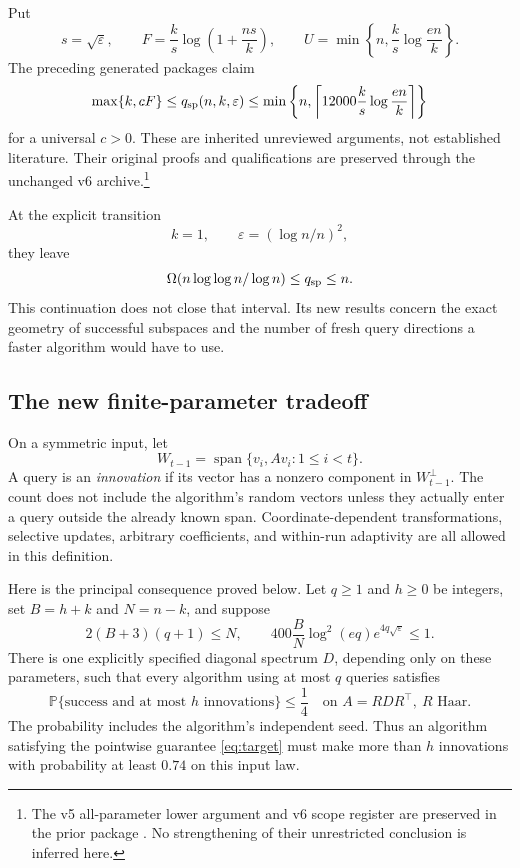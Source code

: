 \documentclass[11pt]{article}
\theoremstyle{definition}
\newcommand{\Prob}{\mathbb P}
\newcommand{\spn}{\operatorname{span}}
\begin{document}
Put
\[
 s=\sqrt\varepsilon,\qquad
 F=\frac{k}{s}\log\left(1+\frac{ns}{k}\right),\qquad
 U=\min\left\{n,\frac{k}{s}\log\frac{en}{k}\right\}.
\]
The preceding generated packages claim
\begin{equation}\label{eq:inherited}
 \max\{k,cF\}\le q_{\rm sp}(n,k,\varepsilon)
 \le\min\left\{n,\left\lceil12000\frac{k}{s}\log\frac{en}{k}\right\rceil\right\}
\end{equation}
for a universal $c>0$. These are inherited unreviewed arguments, not established literature. Their original proofs and qualifications are preserved through the unchanged v6 archive.\footnote{The v5 all-parameter lower argument and v6 scope register are preserved in the prior package \cite{prior}. No strengthening of their unrestricted conclusion is inferred here.}

At the explicit transition
\begin{equation}\label{eq:transition}
 k=1,\qquad \varepsilon=(\log n/n)^2,
\end{equation}
they leave
\[
 \Omega(n\log\log n/\log n)\le q_{\rm sp}\le n.
\]
This continuation does not close that interval. Its new results concern the exact geometry of successful subspaces and the number of fresh query directions a faster algorithm would have to use.

\subsection{The new finite-parameter tradeoff}
On a symmetric input, let
\[
 W_{t-1}=\spn\{v_i,Av_i:1\le i<t\}.
\]
A query is an \emph{innovation} if its vector has a nonzero component in $W_{t-1}^{\perp}$. The count does not include the algorithm's random vectors unless they actually enter a query outside the already known span. Coordinate-dependent transformations, selective updates, arbitrary coefficients, and within-run adaptivity are all allowed in this definition.

Here is the principal consequence proved below. Let $q\ge1$ and $h\ge0$ be integers, set $B=h+k$ and $N=n-k$, and suppose
\begin{equation}\label{eq:tradeoff-hyp}
 2(B+3)(q+1)\le N,\qquad
 400\frac{B}{N}\log^2(eq)e^{4q\sqrt\varepsilon}\le1.
\end{equation}
There is one explicitly specified diagonal spectrum $D$, depending only on these parameters, such that every algorithm using at most $q$ queries satisfies
\begin{equation}\label{eq:tradeoff-intro}
 \Prob\{\text{success and at most }h\text{ innovations}\}\le\frac14
 \quad\text{on }A=RDR^\top,\ R\text{ Haar}.
\end{equation}
The probability includes the algorithm's independent seed. Thus an algorithm satisfying the pointwise guarantee \eqref{eq:target} must make more than $h$ innovations with probability at least $0.74$ on this input law.
\end{document}
